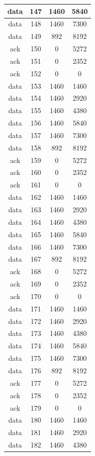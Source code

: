 \documentclass[a4paper,11pt,final]{report}
\begin{document}
\begin{longtable}{|c|c|c|c|}
data & 147 & 1460 & 5840 \\ \hline
data & 148 & 1460 & 7300 \\ \hline
data & 149 & 892 & 8192 \\ \hline
ack & 150 & 0 & 5272 \\ \hline
ack & 151 & 0 & 2352 \\ \hline
ack & 152 & 0 & 0 \\ \hline
data & 153 & 1460 & 1460 \\ \hline
data & 154 & 1460 & 2920 \\ \hline
data & 155 & 1460 & 4380 \\ \hline
data & 156 & 1460 & 5840 \\ \hline
data & 157 & 1460 & 7300 \\ \hline
data & 158 & 892 & 8192 \\ \hline
ack & 159 & 0 & 5272 \\ \hline
ack & 160 & 0 & 2352 \\ \hline
ack & 161 & 0 & 0 \\ \hline
data & 162 & 1460 & 1460 \\ \hline
data & 163 & 1460 & 2920 \\ \hline
data & 164 & 1460 & 4380 \\ \hline
data & 165 & 1460 & 5840 \\ \hline
data & 166 & 1460 & 7300 \\ \hline
data & 167 & 892 & 8192 \\ \hline
ack & 168 & 0 & 5272 \\ \hline
ack & 169 & 0 & 2352 \\ \hline
ack & 170 & 0 & 0 \\ \hline
data & 171 & 1460 & 1460 \\ \hline
data & 172 & 1460 & 2920 \\ \hline
data & 173 & 1460 & 4380 \\ \hline
data & 174 & 1460 & 5840 \\ \hline
data & 175 & 1460 & 7300 \\ \hline
data & 176 & 892 & 8192 \\ \hline
ack & 177 & 0 & 5272 \\ \hline
ack & 178 & 0 & 2352 \\ \hline
ack & 179 & 0 & 0 \\ \hline
data & 180 & 1460 & 1460 \\ \hline
data & 181 & 1460 & 2920 \\ \hline
data & 182 & 1460 & 4380 \\ \hline

\end{longtable}
\end{document}
